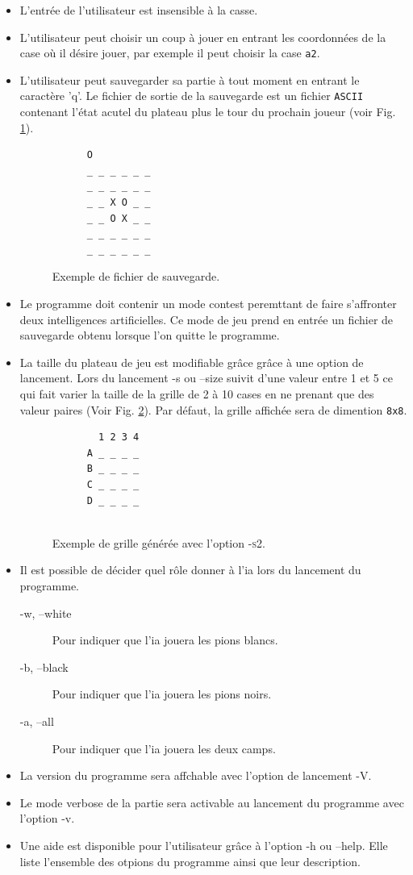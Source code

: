 \documentclass[10pt,a4paper]{article}
\begin{document}
\begin {itemize}
\item  L'entrée de l'utilisateur est insensible à la casse.
\item  L'utilisateur peut choisir un coup à jouer en entrant les coordonnées de la case où il désire jouer, par exemple il peut choisir la case \verb!a2!.
\item  L'utilisateur peut sauvegarder sa partie à tout moment en entrant le caractère 'q'. Le fichier de sortie de la sauvegarde est un fichier \verb!ASCII! contenant l'état acutel du plateau plus le tour du prochain joueur (voir Fig. \ref{fig:exemple_save}).
  \begin{figure}[H]    
    \centering
    \begin{BVerbatim}
      O
      _ _ _ _ _ _
      _ _ _ _ _ _
      _ _ X O _ _
      _ _ O X _ _
      _ _ _ _ _ _
      _ _ _ _ _ _ 
    \end{BVerbatim}
    \caption {Exemple de fichier de sauvegarde.\label{fig:exemple_save}}
    \end{figure}

\item  Le programme doit contenir un mode contest peremttant de faire s'affronter deux intelligences artificielles. Ce mode de jeu prend en entrée un fichier de sauvegarde obtenu lorsque l'on quitte le programme.
\item  La taille du plateau de jeu est modifiable grâce grâce à une option de lancement. Lors du lancement -s ou --size suivit d'une valeur entre 1 et 5 ce qui fait varier la taille de la grille de 2 à 10 cases en ne prenant que des valeur paires (Voir Fig. \ref{fig:exemple_taille}). Par défaut, la grille affichée sera de dimention \verb!8x8!.
  \begin{figure}[H]    
    \centering
    \begin{BVerbatim}
        1 2 3 4 
      A _ _ _ _
      B _ _ _ _
      C _ _ _ _
      D _ _ _ _
      
    \end{BVerbatim}
    \caption {Exemple de grille générée avec l'option \textsc{-s2}.\label{fig:exemple_taille}}
  \end{figure}
\item  Il est possible de décider quel rôle donner à l'ia lors du lancement du programme.
  \begin{description}
  \item [-w, --white] Pour indiquer que l'ia jouera les pions blancs.
  \item [-b, --black] Pour indiquer que l'ia jouera les pions noirs.
  \item [-a, --all] Pour indiquer que l'ia jouera les deux camps.
  \end{description}
\item  La version du programme sera affchable avec l'option de lancement -V.
\item  Le mode verbose de la partie sera activable au lancement du programme avec l'option -v.
\item  Une aide est disponible pour l'utilisateur grâce à l'option -h ou --help. Elle liste l'ensemble des otpions du programme ainsi que leur description.
\end{itemize}
\end{document}
